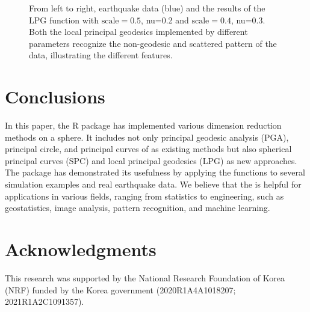 \begin{figure}[!h]
    \caption{From left to right, earthquake data (blue) and the results of the LPG function with $\mbox{scale}=0.5$, nu=0.2 and $\mbox{scale}=0.4$, nu=0.3. Both the local principal geodesics implemented by different parameters recognize the non-geodesic and scattered pattern of the data, illustrating the different features.}
    \label{fig:LPG}
\end{figure}

\section{Conclusions}
In this paper, the R package  has implemented various dimension reduction methods on a sphere. It includes not only principal geodesic analysis (PGA), principal circle, and principal curves of \citet{Hauberg2016} as existing methods but also spherical principal curves (SPC) and local principal geodesics (LPG) as new approaches. The  package has demonstrated its usefulness by applying the functions to several simulation examples and real earthquake data. We believe that the  is helpful for applications in various fields, ranging from statistics to engineering, such as geostatistics, image analysis, pattern recognition, and machine learning.

\section{Acknowledgments}
This research was supported by the National Research Foundation of Korea (NRF) funded by the Korea government (2020R1A4A1018207; 2021R1A2C1091357).




%

\address{Jongmin Lee\\
  Department of Statistics\\
  Seoul National University\\
  Seoul 08826, Korea\\
  (ORCiD 0000-0003-1723-4615)\\
  }

\address{Jang-Hyun Kim\\
  Department of Computer Science and Engineering\\
  Seoul National University\\
  Seoul 08826, Korea\\
  (ORCiD 0000-0001-8433-2712)\\
  }
  
\address{Hee-Seok Oh\\
  Department of Statistics\\
  Seoul National University\\
  Seoul 08826, Korea\\
  (ORCiD 0000-0002-1501-0530)\\
  }
 
%

